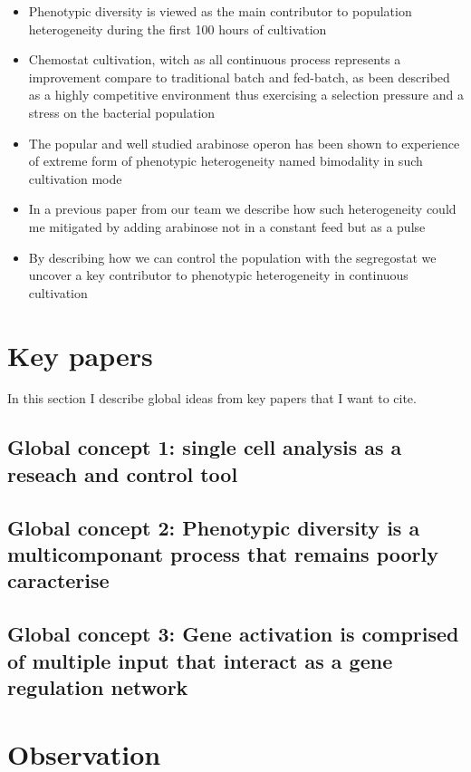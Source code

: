 \documentclass[utf8]{ReportTERRA}
\begin{document}
\begin{itemize}
\item Phenotypic diversity is viewed as the main contributor to population heterogeneity during the first 100 hours of cultivation
\item Chemostat cultivation, witch as all continuous process represents a improvement compare to traditional batch and fed-batch, as been described as a highly competitive environment thus exercising a selection pressure and a stress on the bacterial population
\item The popular and well studied arabinose operon has been shown to experience of extreme form of phenotypic heterogeneity named bimodality in such cultivation mode
\item In a previous paper from our team we describe how such heterogeneity could me mitigated by adding arabinose not in a constant feed but as a pulse
\item By describing how we can control the population with the segregostat we uncover a key contributor to phenotypic heterogeneity in continuous cultivation

\end{itemize}

\section{Key papers}

In this section I describe global ideas from key papers that I want to cite.

\subsection{Global concept 1: single cell analysis as a reseach and control tool}



\subsection{Global concept 2: Phenotypic diversity is a multicomponant process that remains poorly caracterise}

\subsection{Global concept 3: Gene activation is comprised of multiple input that interact as a gene regulation network}

\section{Observation}
\end{document}

